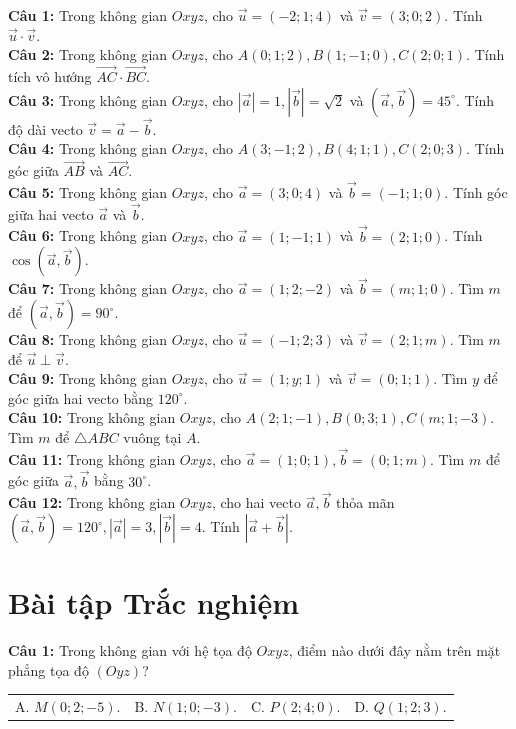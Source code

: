 \documentclass[12pt]{article}
\begin{document}
	\begin{btdo}
		\noindent \textbf{Câu 1:} Trong không gian $Oxyz$, cho $\vec{u} = (-2; 1; 4)$ và $\vec{v} = (3; 0; 2)$. Tính $\vec{u} \cdot \vec{v}$. \\
		\noindent \textbf{Câu 2:} Trong không gian $Oxyz$, cho $A(0; 1; 2), B(1; -1; 0), C(2; 0; 1)$. Tính tích vô hướng $\vec{AC} \cdot \vec{BC}$. \\
		\noindent \textbf{Câu 3:} Trong không gian $Oxyz$, cho $|\vec{a}| = 1, |\vec{b}| = \sqrt{2}$ và $(\vec{a}, \vec{b}) = 45^\circ$. Tính độ dài vecto $\vec{v} = \vec{a} - \vec{b}$. \\
		\noindent \textbf{Câu 4:} Trong không gian $Oxyz$, cho $A(3; -1; 2), B(4; 1; 1), C(2; 0; 3)$. Tính góc giữa $\vec{AB}$ và $\vec{AC}$. \\
		\noindent \textbf{Câu 5:} Trong không gian $Oxyz$, cho $\vec{a} = (3; 0; 4)$ và $\vec{b} = (-1; 1; 0)$. Tính góc giữa hai vecto $\vec{a}$ và $\vec{b}$. \\
		\noindent \textbf{Câu 6:} Trong không gian $Oxyz$, cho $\vec{a} = (1; -1; 1)$ và $\vec{b} = (2; 1; 0)$. Tính $\cos(\vec{a}, \vec{b})$. \\
		\noindent \textbf{Câu 7:} Trong không gian $Oxyz$, cho $\vec{a} = (1; 2; -2)$ và $\vec{b} = (m; 1; 0)$. Tìm $m$ để $(\vec{a}, \vec{b}) = 90^\circ$. \\
		\noindent \textbf{Câu 8:} Trong không gian $Oxyz$, cho $\vec{u} = (-1; 2; 3)$ và $\vec{v} = (2; 1; m)$. Tìm $m$ để $\vec{u} \perp \vec{v}$. \\
		\noindent \textbf{Câu 9:} Trong không gian $Oxyz$, cho $\vec{u} = (1; y; 1)$ và $\vec{v} = (0; 1; 1)$. Tìm $y$ để góc giữa hai vecto bằng $120^\circ$. \\
		\noindent \textbf{Câu 10:} Trong không gian $Oxyz$, cho $A(2; 1; -1), B(0; 3; 1), C(m; 1; -3)$. Tìm $m$ để $\triangle ABC$ vuông tại $A$. \\
		\noindent \textbf{Câu 11:} Trong không gian $Oxyz$, cho $\vec{a} = (1; 0; 1), \vec{b} = (0; 1; m)$. Tìm $m$ để góc giữa $\vec{a}, \vec{b}$ bằng $30^\circ$. \\
		\noindent \textbf{Câu 12:} Trong không gian $Oxyz$, cho hai vecto $\vec{a}, \vec{b}$ thỏa mãn $(\vec{a}, \vec{b}) = 120^\circ, |\vec{a}| = 3, |\vec{b}| = 4$. Tính $|\vec{a} + \vec{b}|$.
	\end{btdo}
	
	\section{Bài tập Trắc nghiệm}
	\noindent \textbf{Câu 1:} Trong không gian với hệ tọa độ $Oxyz$, điểm nào dưới đây nằm trên mặt phẳng tọa độ $(Oyz)$? \\
	\noindent
	\begin{tabular}{p{} p{} p{} p{}}
		A. $M(0; 2; -5)$. & B. $N(1; 0; -3)$. & C. $P(2; 4; 0)$. & D. $Q(1; 2; 3)$.
	\end{tabular}
	
\end{document}
